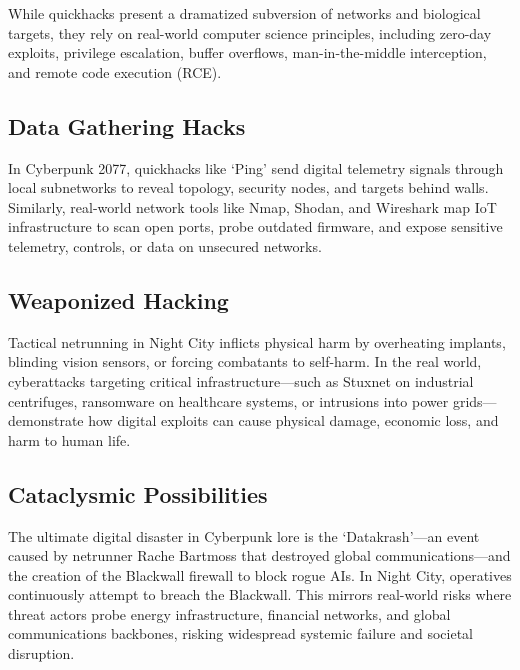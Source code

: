 \documentclass{article}%
\begin{document}
While quickhacks present a dramatized subversion of networks and biological targets, they rely on real-world computer science principles, including zero-day exploits, privilege escalation, buffer overflows, man-in-the-middle interception, and remote code execution (RCE).

\subsection{Data Gathering Hacks}
In Cyberpunk 2077, quickhacks like `Ping' send digital telemetry signals through local subnetworks to reveal topology, security nodes, and targets behind walls. Similarly, real-world network tools like Nmap, Shodan, and Wireshark map IoT infrastructure to scan open ports, probe outdated firmware, and expose sensitive telemetry, controls, or data on unsecured networks.

\subsection{Weaponized Hacking}
Tactical netrunning in Night City inflicts physical harm by overheating implants, blinding vision sensors, or forcing combatants to self-harm. In the real world, cyberattacks targeting critical infrastructure---such as Stuxnet on industrial centrifuges, ransomware on healthcare systems, or intrusions into power grids---demonstrate how digital exploits can cause physical damage, economic loss, and harm to human life.

\subsection{Cataclysmic Possibilities}
The ultimate digital disaster in Cyberpunk lore is the `Datakrash'---an event caused by netrunner Rache Bartmoss that destroyed global communications---and the creation of the Blackwall firewall to block rogue AIs. In Night City, operatives continuously attempt to breach the Blackwall. This mirrors real-world risks where threat actors probe energy infrastructure, financial networks, and global communications backbones, risking widespread systemic failure and societal disruption.
\end{document}

